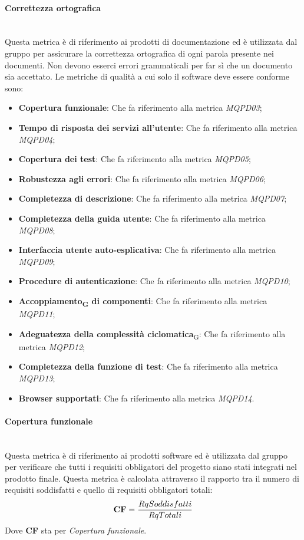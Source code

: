 \paragraph{Correttezza ortografica}\mbox{}\\
Questa metrica è di riferimento ai prodotti di documentazione ed è utilizzata dal gruppo per assicurare la correttezza ortografica di ogni parola presente nei documenti. Non devono esserci errori grammaticali per far sì che un documento sia accettato.
Le metriche di qualità a cui solo il software deve essere conforme sono:
\begin{itemize}
	\item \textbf{Copertura funzionale}: Che fa riferimento alla metrica \textit{MQPD03};
	\item \textbf{Tempo di risposta dei servizi all'utente}: Che fa riferimento alla metrica \textit{MQPD04};
	\item \textbf{Copertura dei test}: Che fa riferimento alla metrica \textit{MQPD05};
	\item \textbf{Robustezza agli errori}: Che fa riferimento alla metrica \textit{MQPD06};
	\item \textbf{Completezza di descrizione}: Che fa riferimento alla metrica \textit{MQPD07};
	\item \textbf{Completezza della guida utente}: Che fa riferimento alla metrica \textit{MQPD08};
	\item \textbf{Interfaccia utente auto-esplicativa}: Che fa riferimento alla metrica \textit{MQPD09};
	\item \textbf{Procedure di autenticazione}: Che fa riferimento alla metrica \textit{MQPD10};
	\item \textbf{Accoppiamento\textsubscript{G} di componenti}: Che fa riferimento alla metrica \textit{MQPD11};
	\item \textbf{Adeguatezza della complessità ciclomatica}\textsubscript{G}: Che fa riferimento alla metrica \textit{MQPD12};
	\item \textbf{Completezza della funzione di test}: Che fa riferimento alla metrica \textit{MQPD13};
	\item \textbf{Browser supportati}: Che fa riferimento alla metrica \textit{MQPD14}.
\end{itemize}
\paragraph{Copertura funzionale}\mbox{}\\
Questa metrica è di riferimento ai prodotti software ed è utilizzata dal gruppo per verificare che tutti i requisiti obbligatori del progetto siano stati integrati nel prodotto finale. Questa metrica è calcolata attraverso il rapporto tra il numero di requisiti soddisfatti e quello di requisiti obbligatori totali:
\begin{align*}
	\centering
	\textbf{CF} = \frac{RqSoddisfatti}{RqTotali}
\end{align*}
Dove \textbf{CF} sta per \textit{Copertura funzionale}.
